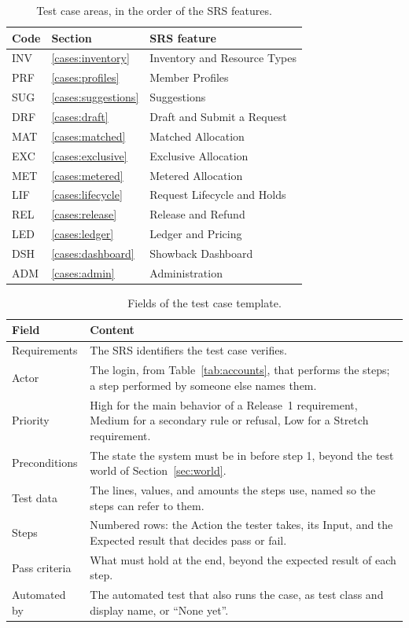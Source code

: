 \begin{table}[h]
\centering\small
\caption{Test case areas, in the order of the SRS features.}\label{tab:areas}
\begin{tabular}{@{}llL{8cm}@{}}
\toprule
\textbf{Code} & \textbf{Section} & \textbf{SRS feature} \\
\midrule
INV & \ref{cases:inventory} & Inventory and Resource Types \\
PRF & \ref{cases:profiles} & Member Profiles \\
SUG & \ref{cases:suggestions} & Suggestions \\
DRF & \ref{cases:draft} & Draft and Submit a Request \\
MAT & \ref{cases:matched} & Matched Allocation \\
EXC & \ref{cases:exclusive} & Exclusive Allocation \\
MET & \ref{cases:metered} & Metered Allocation \\
LIF & \ref{cases:lifecycle} & Request Lifecycle and Holds \\
REL & \ref{cases:release} & Release and Refund \\
LED & \ref{cases:ledger} & Ledger and Pricing \\
DSH & \ref{cases:dashboard} & Showback Dashboard \\
ADM & \ref{cases:admin} & Administration \\
\bottomrule
\end{tabular}
\end{table}

\begin{table}[h]
\centering\small
\caption{Fields of the test case template.}\label{tab:fields}
\begin{tabular}{@{}lL{12.5cm}@{}}
\toprule
\textbf{Field} & \textbf{Content} \\
\midrule
Requirements & The SRS identifiers the test case verifies. \\
Actor & The login, from Table~\ref{tab:accounts}, that performs the steps; a step performed by someone else names them. \\
Priority & High for the main behavior of a Release~1 requirement, Medium for a secondary rule or refusal, Low for a Stretch requirement. \\
Preconditions & The state the system must be in before step 1, beyond the test world of Section~\ref{sec:world}. \\
Test data & The lines, values, and amounts the steps use, named so the steps can refer to them. \\
Steps & Numbered rows: the Action the tester takes, its Input, and the Expected result that decides pass or fail. \\
Pass criteria & What must hold at the end, beyond the expected result of each step. \\
Automated by & The automated test that also runs the case, as test class and display name, or ``None yet''. \\
\bottomrule
\end{tabular}
\end{table}
